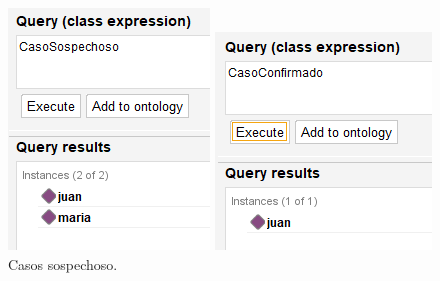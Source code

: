 \documentclass[11pt, letterpaper]{article}
\begin{document}
\begin{figure}[h!]
	\centering
	\begin{minipage}[t]{0.5\linewidth} %
		\centering
		\includegraphics[width=\linewidth]{IMG/R3}
		\caption{Casos sospechoso.}
		\label{fig:r3}
	\end{minipage}%
	\hfill %
	\begin{minipage}[t]{0.5\linewidth} %
		\centering
		\includegraphics[width=\linewidth]{IMG/R4}

\end{minipage}
\end{figure}
\end{document}
